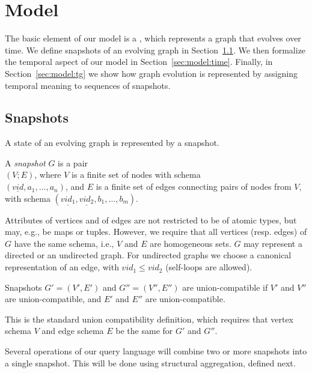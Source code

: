 \section{Model}
\label{sec:model}

The basic element of our model is a \tg, which represents a graph that
evolves over time.  We define snapshots of an evolving graph in
Section~\ref{sec:model:structure}.  We then formalize the temporal
aspect of our model in Section~\ref{sec:model:time}.  Finally, in
Section~\ref{sec:model:tg} we show how graph evolution is represented
by assigning temporal meaning to sequences of snapshots.

\subsection{Snapshots}
\label{sec:model:structure}

A state of an evolving graph is represented by a snapshot.

\begin{definition}[Snapshot]
A {\em snapshot} $G$ is a pair\\ $(V; E)$, where $V$ is a finite set of
nodes with schema\\ $(\underline{vid}, a_1, \ldots, a_n)$, and $E$ is a
finite set of edges connecting pairs of nodes from $V$, with schema
$(\underline{vid_1}, \underline{vid_2}, b_1, \ldots, b_m)$.
\label{def:sg} 
\end{definition}

Attributes of vertices and of edges are not restricted to be of atomic
types, but may, e.g., be maps or tuples. However, we require that all
vertices (resp. edges) of $G$ have the same schema, i.e., $V$ and $E$
are homogeneous sets. $G$ may represent a directed or an undirected
graph.  For undirected graphs we choose a canonical representation of
an edge, with $vid_1 \leq vid_2$ (self-loops are allowed).

\begin{definition} 
Snapshots $G' = (V', E')$ and $G'' = (V'', E'')$ are
union-compatible if $V'$ and $V''$ are union-compatible, and $E'$
and $E''$ are union-compatible.
\label{def:scompat}
\end{definition}

This is the standard union compatibility definition, which requires
that vertex schema $V$ and edge schema $E$ be the same for $G'$ and
$G''$.

Several operations of our query language will combine two or more
snapshots into a single snapshot. This will be done using structural
aggregation, defined next.  

